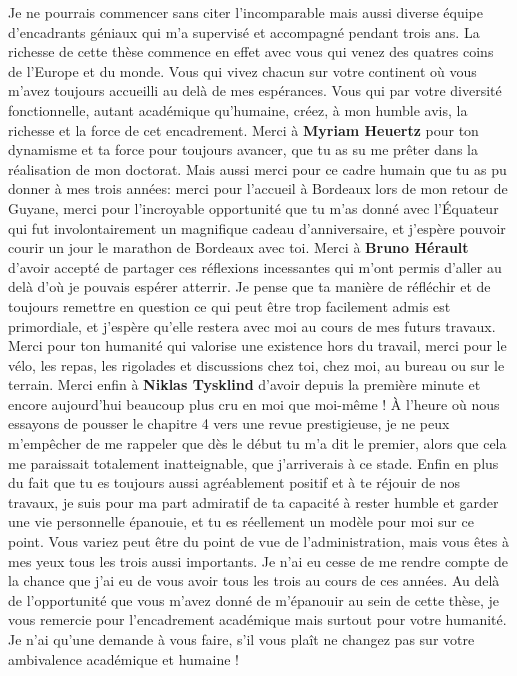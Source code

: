 \documentclass[12pt,twoside,a4paper, a]{article}
\begin{document}
Je ne pourrais commencer sans citer l'incomparable mais aussi diverse
équipe d'encadrants géniaux qui m'a supervisé et accompagné pendant
trois ans. La richesse de cette thèse commence en effet avec vous qui
venez des quatres coins de l'Europe et du monde. Vous qui vivez chacun
sur votre continent où vous m'avez toujours accueilli au delà de mes
espérances. Vous qui par votre diversité fonctionnelle, autant
académique qu'humaine, créez, à mon humble avis, la richesse et la force
de cet encadrement. Merci à \textbf{Myriam Heuertz} pour ton dynamisme et ta
force pour toujours avancer, que tu as su me prêter dans la réalisation
de mon doctorat. Mais aussi merci pour ce cadre humain que tu as pu
donner à mes trois années: merci pour l'accueil à Bordeaux lors de mon
retour de Guyane, merci pour l'incroyable opportunité que tu m'as donné
avec l'Équateur qui fut involontairement un magnifique cadeau
d'anniversaire, et j'espère pouvoir courir un jour le marathon de
Bordeaux avec toi. Merci à \textbf{Bruno Hérault} d'avoir accepté de partager
ces réflexions incessantes qui m'ont permis d'aller au delà d'où je
pouvais espérer atterrir. Je pense que ta manière de réfléchir et de
toujours remettre en question ce qui peut être trop facilement admis est
primordiale, et j'espère qu'elle restera avec moi au cours de mes futurs
travaux. Merci pour ton humanité qui valorise une existence hors du
travail, merci pour le vélo, les repas, les rigolades et discussions
chez toi, chez moi, au bureau ou sur le terrain. Merci enfin à \textbf{Niklas
Tysklind} d'avoir depuis la première minute et encore aujourd'hui
beaucoup plus cru en moi que moi-même ! À l'heure où nous essayons de
pousser le chapitre 4 vers une revue prestigieuse, je ne peux m'empêcher
de me rappeler que dès le début tu m'a dit le premier, alors que cela me
paraissait totalement inatteignable, que j'arriverais à ce stade. Enfin
en plus du fait que tu es toujours aussi agréablement positif et à te
réjouir de nos travaux, je suis pour ma part admiratif de ta capacité à
rester humble et garder une vie personnelle épanouie, et tu es
réellement un modèle pour moi sur ce point. Vous variez peut être du
point de vue de l'administration, mais vous êtes à mes yeux tous les
trois aussi importants. Je n'ai eu cesse de me rendre compte de la
chance que j'ai eu de vous avoir tous les trois au cours de ces années.
Au delà de l'opportunité que vous m'avez donné de m'épanouir au sein de
cette thèse, je vous remercie pour l'encadrement académique mais surtout
pour votre humanité. Je n'ai qu'une demande à vous faire, s'il vous
plaît ne changez pas sur votre ambivalence académique et humaine !
\end{document}
